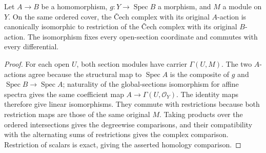 \begin{lemma}
\label{lem:relative-arithmetic-cech-coefficients}
\leanok
Let $A\to B$ be a homomorphism, $g:Y\to\operatorname{Spec}B$ a morphism,
and $M$ a module on $Y$. On the same ordered cover, the Čech complex with
its original $A$-action is canonically isomorphic to restriction of the
Čech complex with its original $B$-action. The isomorphism fixes every
open-section coordinate and commutes with every differential.
\end{lemma}
\begin{proof}
For each open $U$, both section modules have carrier $\Gamma(U,M)$.
The two $A$-actions agree because the structural map to
$\operatorname{Spec}A$ is the composite of $g$ and
$\operatorname{Spec}B\to\operatorname{Spec}A$; naturality of the
global-sections isomorphism for affine spectra gives the same coefficient
map $A\to\Gamma(U,\mathcal O_Y)$. The identity maps therefore give linear
isomorphisms. They commute with restrictions because both restriction
maps are those of the same original $M$. Taking products over the ordered
intersections gives the degreewise comparisons, and their compatibility
with the alternating sums of restrictions gives the complex comparison.
Restriction of scalars is exact, giving the asserted homology comparison.
\end{proof}

